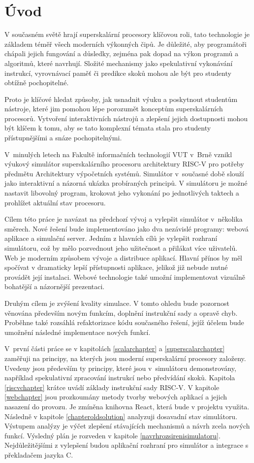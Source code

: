 
\chapter{Úvod}

V současném světě hrají superskalární procesory klíčovou roli, tato technologie je základem téměř všech moderních výkonných čipů.
Je důležité, aby programátoři chápali jejich fungování a důsledky, zejména pak dopad na výkon programů a algoritmů, které navrhují.
Složité mechanismy jako spekulativní vykonávání instrukcí, vyrovnávací paměť či predikce skoků mohou ale být pro studenty obtížně pochopitelné.

Proto je klíčové hledat způsoby, jak usnadnit výuku a poskytnout studentům nástroje, které jim pomohou lépe porozumět konceptům superskalárních procesorů.
Vytvoření interaktivních nástrojů a zlepšení jejich dostupnosti mohou být klíčem k tomu, aby se tato komplexní témata stala pro studenty přístupnějšími a snáze pochopitelnými.

V~minulých letech na Fakultě informačních technologií VUT v~Brně vznikl výukový simulátor superskalárního procesoru architektury RISC-V \cite{horkySim, vavraSim} pro potřeby předmětu Architektury výpočetních systémů.
Simulátor v~současné době slouží jako interaktivní a názorná ukázka probíraných principů.
V simulátoru je možné nastavit libovolný program, krokovat jeho vykonání po jednotlivých taktech a prohlížet aktuální stav procesoru.

Cílem této práce je navázat na předchozí vývoj a vylepšit simulátor v~několika směrech.
Nové řešení bude implementováno jako dva nezávislé programy: webová aplikace a simulační server.
Jedním z hlavních cílů je vylepšit rozhraní simulátoru, což by mělo pozvednout jeho užitečnost a přilákat více uživatelů.
Web je moderním způsobem vývoje a distribuce aplikací.
Hlavní přínos by měl spočívat v dramaticky lepší přístupnosti aplikace, jelikož již nebude nutné provádět její instalaci.
Webové technologie také umožní implementovat vizuálně bohatější a názornější prezentaci.

Druhým cílem je zvýšení kvality simulace.
V tomto ohledu bude pozornost věnována především novým funkcím, doplnění instrukční sady a opravě chyb.
Proběhne také rozsáhlá refaktorizace kódu současného řešení, jejíž účelem bude umožnění následné implementace nových funkcí.

V~první části práce se v kapitolách \ref{scalarchapter} a \ref{superscalarchapter} zaměřuji na principy, na kterých jsou moderní superskalární procesory založeny.
Uvedeny jsou především ty principy, které jsou v~simulátoru demonstrovány, například spekulativní zpracování instrukcí nebo předvídání skoků.
Kapitola \ref{riscvchapter} krátce uvádí základy instrukční sady RISC-V.
V kapitole \ref{webchapter} jsou prozkoumány metody tvorby webových aplikací a jejich nasazení do provozu.
Je zmíněna knihovna React, která bude v projektu využita. 
Následně v kapitole \ref{chapteroldsolution} analyzuji dosavadní stav simulátoru.
Výstupem analýzy je výčet zlepšení stávajících mechanismů a návrh zcela nových funkcí.
Výsledný plán je rozveden v kapitole \ref{navrhrozsirenisimulatoru}.
Nejdůležitějšími z vylepšení budou aplikační rozhraní pro simulátor a integrace s překladačem jazyka C.

